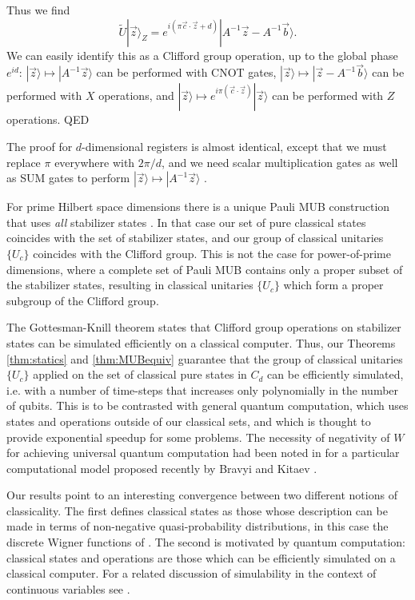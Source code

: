 \documentclass[aps,twocolumn,showpacs,nofootinbib,superscriptaddress]{revtex4}
\newcommand{\QED}{\hfill QED}
\newcommand{\ket}[1]{|{#1}\rangle}
\begin{document}
Thus we find
\begin{equation}
\tilde{U} \ket{\vec{z}}_Z = e^{i(\pi \vec{c} \cdot \vec{z} + d)}
\ket{A^{-1}\vec{z} - A^{-1} \vec{b}}.
\end{equation}
We can easily identify this as a Clifford group operation, up to
the global phase $e^{id}$:  $\ket{\vec{z}} \mapsto
\ket{A^{-1}\vec{z}}$ can be performed with CNOT gates,
$\ket{\vec{z}} \mapsto \ket{\vec{z} - A^{-1}\vec{b}}$ can be
performed with $X$ operations, and $\ket{\vec{z}} \mapsto
e^{i\pi(\vec{c} \cdot \vec{z})} \ket{\vec{z}}$ can be performed
with $Z$ operations. \QED
\medskip

The proof for $d$-dimensional registers is almost identical,
except that we must replace $\pi$ everywhere with $2\pi/d$, and we
need scalar multiplication gates as well as SUM gates to perform
$\ket{\vec{z}} \mapsto \ket{A^{-1}\vec{z}}$ \cite{Gottesman99b}.

For prime Hilbert space dimensions there is a unique Pauli MUB construction that uses \textit{all} stabilizer states \cite{BandyopadhyayBRV02}. In that case our set of pure classical states coincides with the set of stabilizer states, and our group of classical unitaries $\{U_c\}$ coincides with the Clifford group. This is not the case for power-of-prime dimensions, where a complete set of Pauli MUB contains only a proper subset of the stabilizer states, resulting in classical unitaries $\{U_c\}$ which form a proper subgroup of the Clifford group.

The Gottesman-Knill theorem \cite{Gottesman97} states that
Clifford group operations on stabilizer states can be simulated
efficiently on a classical computer. Thus, our Theorems
\ref{thm:statics} and \ref{thm:MUBequiv} guarantee that the group
of classical unitaries $\{U_c\}$ applied on the set of classical
pure states in $C_d$ can be efficiently simulated, i.e. with a
number of time-steps that increases only polynomially in the
number of qubits. This is to be contrasted with general quantum
computation, which uses states and operations outside of our
classical sets, and which is thought to provide exponential
speedup for some problems. The necessity of negativity of $W$ for
achieving universal quantum computation had been noted in
\cite{Galvao05} for a particular computational model proposed
recently by Bravyi and Kitaev \cite{BravyiK05}.

Our results point to an interesting convergence between two
different notions of classicality. The first defines classical
states as those whose description can be made in terms of
non-negative quasi-probability distributions, in this case the
discrete Wigner functions of \cite{GibbonsHW04}. The second is
motivated by quantum computation: classical states and operations
are those which can be efficiently simulated on a classical
computer. For a related discussion of simulability in the context
of continuous variables see \cite{BartlettSBN02}.
\end{document}
